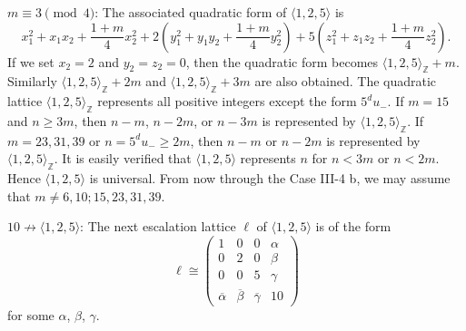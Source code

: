 \documentclass[a4paper,10pt,reqno]{amsart}
\begin{document}
{} $m \equiv 3 \pmod{4}$: The associated quadratic form of ${\langle {1,2,5} \rangle}$ is
\[
    x_1^2+x_1x_2+\frac{1+m}4x_2^2 + 2\left(y_1^2+y_1y_2+\frac{1+m}4y_2^2\right) +
    5\left(z_1^2+z_1z_2+\frac{1+m}4z_2^2\right).
\]
If we set $x_2=2$ and $y_2=z_2=0$, then the quadratic form becomes ${\langle {1,2,5} \rangle}_{\mathbb{Z}}+m$. Similarly
${\langle {1,2,5} \rangle}_{\mathbb{Z}}+2m$ and ${\langle {1,2,5} \rangle}_{\mathbb{Z}}+3m$ are also obtained. The quadratic lattice ${\langle {1,2,5} \rangle}_{\mathbb{Z}}$
represents all positive integers except the form $5^d u_{-}$. If $m=15$ and $n \ge 3m$, then $n-m$,
$n-2m$, or $n-3m$ is represented by ${\langle {1,2,5} \rangle}_{\mathbb{Z}}$. If $m=23, 31, 39$ or $n = 5^d u_{-} \geq 2m$,
then $n-m$ or $n-2m$ is represented by ${\langle {1,2,5} \rangle}_{\mathbb{Z}}$. It is easily verified that ${\langle {1,2,5} \rangle}$
represents $n$ for $n < 3m$ or $n<2m$. Hence ${\langle {1,2,5} \rangle}$ is universal. From now through the Case
III-4 b, we may assume that $m \ne 6, 10; 15, 23, 31, 39$.

{} $10 \not\to {\langle {1,2,5} \rangle}$:  The next escalation lattice $\ell$ of ${\langle {1,2,5} \rangle}$ is of
the form
\[  \ell \cong
    \begin{pmatrix}
        1 & 0 & 0 & \alpha \\
        0 & 2 & 0 & \beta \\
        0 & 0 & 5 & \gamma \\
        {\overline{{\alpha}}} & {\overline{{\beta}}} & {\overline{{\gamma}}} & 10
    \end{pmatrix}
\]
for some $\alpha$, $\beta$, $\gamma$.
\end{document}
